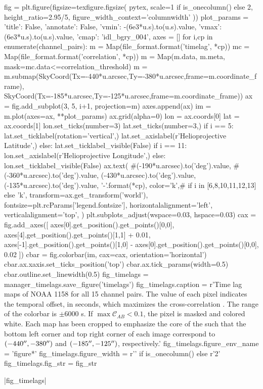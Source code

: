 \begin{pycode}
fig = plt.figure(figsize=texfigure.figsize(
    pytex,
    scale=1 if is_onecolumn() else 2,
    height_ratio=2.95/5,
    figure_width_context='columnwidth'
))
plot_params = {
    'title': False, 
    'annotate': False,
    'vmin': -(6e3*u.s).to(u.s).value,
    'vmax': (6e3*u.s).to(u.s).value,
    'cmap': 'idl_bgry_004',
}
axes = []
for i,cp in enumerate(channel_pairs):
    m = Map(file_format.format('timelag', *cp))
    mc = Map(file_format.format('correlation', *cp))
    m = Map(m.data, m.meta, mask=mc.data<=correlation_threshold)
    m = m.submap(SkyCoord(Tx=-440*u.arcsec,Ty=-380*u.arcsec,frame=m.coordinate_frame),
                 SkyCoord(Tx=-185*u.arcsec,Ty=-125*u.arcsec,frame=m.coordinate_frame))
    ax = fig.add_subplot(3, 5, i+1, projection=m)
    axes.append(ax)
    im = m.plot(axes=ax, **plot_params)
    ax.grid(alpha=0)
    lon = ax.coords[0]
    lat = ax.coords[1]
    lon.set_ticks(number=3)
    lat.set_ticks(number=3,) 
    if i == 5:
        lat.set_ticklabel(rotation='vertical',)
        lat.set_axislabel(r'Helioprojective Latitude',)
    else:
        lat.set_ticklabel_visible(False)
    if i == 11:
        lon.set_axislabel(r'Helioprojective Longitude',)
    else:
        lon.set_ticklabel_visible(False)
    ax.text(
        #(-190*u.arcsec).to('deg').value,
        #(-360*u.arcsec).to('deg').value,
        (-430*u.arcsec).to('deg').value,
        (-135*u.arcsec).to('deg').value,
        '{}-{}'.format(*cp),
        color='k',# if i in [6,8,10,11,12,13] else 'k',
        transform=ax.get_transform('world'),
        fontsize=plt.rcParams['legend.fontsize'],
        horizontalalignment='left',
        verticalalignment='top',
    )
plt.subplots_adjust(wspace=0.03, hspace=0.03)
cax = fig.add_axes([
    axes[0].get_position().get_points()[0,0],
    axes[4].get_position().get_points()[1,1] + 0.01,
    axes[-1].get_position().get_points()[1,0] - axes[0].get_position().get_points()[0,0], 
    0.02
])
cbar = fig.colorbar(im, cax=cax, orientation='horizontal')
cbar.ax.xaxis.set_ticks_position('top')
cbar.ax.tick_params(width=0.5)
cbar.outline.set_linewidth(0.5)
fig_timelags = manager_timelags.save_figure('timelags')
fig_timelags.caption = r'Time lag maps of \AR{} NOAA 1158 for all 15 channel pairs. The value of each pixel indicates the temporal offset, in seconds, which maximizes the cross-correlation . The range of the colorbar is $\pm6000$ s. If $\max\mathcal{C}_{AB}<0.1$, the pixel is masked and colored white. Each map has been cropped to emphasize the core of the \AR{} such that the bottom left corner and top right corner of each image correspond to $(-440\mbox{$^{\prime\prime}$},-380\mbox{$^{\prime\prime}$})$ and $(-185\mbox{$^{\prime\prime}$},-125\mbox{$^{\prime\prime}$})$, respectively.'
fig_timelags.figure_env_name = 'figure*'
fig_timelags.figure_width = r'\columnwidth' if is_onecolumn() else r'2\columnwidth'
fig_timelags.fig_str = fig_str
\end{pycode}
|fig_timelags|

